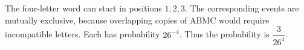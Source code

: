 The four-letter word can start in positions $1,2,3$. The corresponding events are mutually exclusive, because overlapping copies of ABMC would require incompatible letters. Each has probability $26^{-4}$. Thus the probability is $\boxed{\dfrac{3}{26^4}}$.
